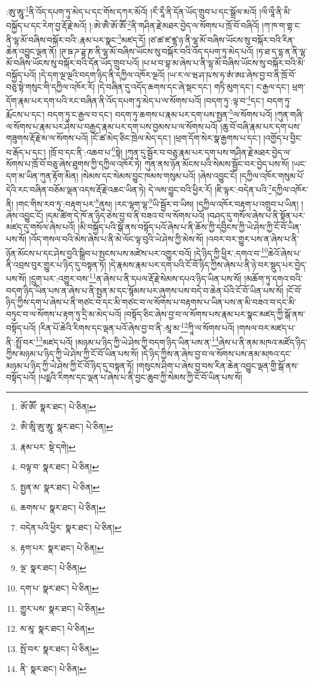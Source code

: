 :ཨུ་ཨཱུ་\footnote{ཨོ་ཨཽ་  སྣར་ཐང་།  པེ་ཅིན། }ནི་འོད་དཔག་ཏུ་མེད་པ་དང་གོས་དཀར་མོའོ། །རྀ་རཱྀ་ནི་དོན་ཡོད་གྲུབ་པ་དང་སྒྲོལ་མའོ། །ལྀ་ལཱྀ་ནི་མི་བསྐྱོད་པ་དང་རེག་བྱ་རྡོ་རྗེ་མའོ། །:ཨེ་ཨཻ་ཨོ་ཨཽ་\footnote{ཨི་ཨཱི་ཨུ་ཨཱུ་  སྣར་ཐང་།  པེ་ཅིན། }ནི་གཤིན་རྗེ་མཐར་བྱེད་ལ་སོགས་པ་ཁྲོ་བོ་བཞིའོ། །ཀ་ཁ་ག་གྷ་ང་ནི་ལྷ་མོ་བཞིས་བསྐོར་བའི་:རྣམ་པར་སྣང་\footnote{རྣམ་པར་  སྡེ་དགེ། }མཛད་དོ། །ཙ་ཚ་ཛ་ཛྷ་ཉ་ནི་ལྷ་མོ་བཞིས་ཡོངས་སུ་བསྐོར་བའི་རིན་ཆེན་འབྱུང་ལྡན་ནོ། །ཊ་ཋ་ཌ་ཌྷ་ཎ་ནི་ལྷ་མོ་བཞིས་ཡོངས་སུ་བསྐོར་བའི་འོད་དཔག་ཏུ་མེད་པའོ། །ཏ་ཐ་ད་དྷ་ན་ནི་ལྷ་མོ་བཞིས་ཡོངས་སུ་བསྐོར་བའི་དོན་ཡོད་གྲུབ་པའོ། །པ་ཕ་བ་བྷ་མ་ཞེས་པ་ནི་ལྷ་མོ་བཞིས་ཡོངས་སུ་བསྐོར་བའི་མི་བསྐྱོད་པའོ། །དེ་དག་ལྔ་ལྔའི་བདག་ཉིད་ནི་དཀྱིལ་འཁོར་ལྔའོ། །ཡ་ར་ལ་ཝ་ཤ་ཥ་ས་ཧ་ཨཾ་ཨཿ་ཞེས་བྱ་བ་ནི་ཁྲོ་བོ་བཅུ་སྟེ་གསུང་གི་དཀྱིལ་འཁོར་རོ། །དེ་བཞིན་དུ་འདོད་ཆགས་དང་ཞེ་སྡང་དང་། གཏི་མུག་དང་། ང་རྒྱལ་དང་། ཕྲག་དོག་རྣམ་པར་དག་པའི་རང་བཞིན་ནི་འོད་དཔག་ཏུ་མེད་པ་ལ་སོགས་པའོ། །བདག་ཏུ་:ལྟ་བ་\footnote{བལྟ་བ་  སྣར་ཐང་།  པེ་ཅིན། }དང་། བདག་ཏུ་རྨོངས་པ་དང་། བདག་ཏུ་ང་རྒྱལ་བ་དང་། བདག་ཏུ་ཆགས་པ་རྣམ་པར་དག་པས་སྤྱན་\footnote{སྤྱན་མ་  སྣར་ཐང་།  པེ་ཅིན། }ལ་སོགས་པའོ། །ཀུན་གཞི་ལ་སོགས་པ་རྣམ་པར་ཤེས་པ་བརྒྱད་རྣམ་པར་དག་པས་བྱམས་པ་ལ་སོགས་པའོ། །ཆུ་བོ་བཞི་རྣམ་པར་དག་པས་གཟུགས་རྡོ་རྗེ་མ་ལ་སོགས་པའོ། །ངོ་ཚ་མེད་ཅིང་ཁྲེལ་མེད་དང་། །ཕྲག་དོག་སེར་སྣ་རྒྱགས་པ་དང་། །འགྱོད་པ་བྱིང་བ་རྒོད་པ་དང་། །ཁྲོ་བ་དང་ནི་:འཆབ་པ་\footnote{ཆགས་པ་  སྣར་ཐང་།  པེ་ཅིན། }སྟེ། །ཀུན་དུ་སྦྱོར་བ་བཅུ་རྣམ་པར་དག་པས་གཤིན་རྗེ་མཐར་བྱེད་ལ་སོགས་པ་ཁྲོ་བོ་བཅུ་ཞེས་ཐུགས་ཀྱི་དཀྱིལ་འཁོར་ཏེ། ཀུན་ནས་ཉོན་མོངས་པའི་སེམས་སྦྱོང་བར་བྱེད་པས་སོ། །ཡང་དག་མ་ཡིན་ཀུན་རྟོག་མིན། །སེམས་དང་སེམས་བྱུང་ཁམས་གསུམ་པའོ། །ཞེས་འབྱུང་ངོ། །དཀྱིལ་འཁོར་གསུམ་པོ་དེའི་རང་བཞིན་བཅོམ་ལྡན་འདས་རྡོ་རྗེ་འཆང་ཡིན་ཏེ། དེ་ལས་བྱུང་བའི་ཕྱིར་རོ། །ཇི་ལྟར་:བདེན་པའི་\footnote{བདེན་པའི་ཕྱིར་  སྣར་ཐང་།  པེ་ཅིན། }དཀྱིལ་འཁོར་ནི། །གང་གིས་རབ་ཏུ་:བརྟག་པར་\footnote{རྟག་པར་  སྣར་ཐང་།  པེ་ཅིན། }ནུས། །རང་ལྷག་ལྷ་\footnote{ལྔ་  སྣར་ཐང་།  པེ་ཅིན། }ཡི་སྦྱོར་བ་ཡིས། །དཀྱིལ་འཁོར་བརྟག་པ་འགྲུབ་པ་ཡིན། །ཞེས་འབྱུང་ངོ། །དམ་ཚིག་དེ་ཁོ་ན་ཉིད་ཅེས་བྱ་བ་ནི་བཟའ་བ་ལ་སོགས་པའོ། །བཤད་དུ་གསོལ་ཞེས་པ་ནི་སྟོན་པར་མཛད་དུ་གསོལ་ཞེས་པའོ། །མི་བསྐྱོད་པའི་སྒོ་ནས་བསྟོད་པའོ་ཞེས་པ་ནི་ཆོས་ཀྱི་དབྱིངས་ཀྱི་ཡེ་ཤེས་ཀྱི་ངོ་བོ་ཡིན་པས་སོ། །འོད་གསལ་བའི་མེས་ཞེས་པ་ནི་མེ་ལོང་ལྟ་བུའི་ཡེ་ཤེས་ཀྱི་མེས་སོ། །འབར་བར་གྱུར་པས་ན་ཞེས་པ་ནི་ཉོན་མོངས་པ་དང་ཤེས་བྱའི་སྒྲིབ་པ་སྤངས་པས་མཛེས་པར་འགྱུར་བའོ། །དེ་ཉིད་ཀྱི་ཕྱིར་:དགའ་བ་\footnote{དག་པ་  སྣར་ཐང་།  པེ་ཅིན། }ཆེའོ་ཞེས་པ་ནི་འབྲས་བུར་གྱུར་པ་ཉིད་དུ་བསྟན་ཏོ། །དེ་རྣམས་རྣམ་པར་དག་པའི་ངོ་བོ་ཉིད་ཀྱིས་ཞེས་པ་ནི་ཉེ་བར་སྡུད་པར་བྱེད་པས་སོ། །དྲུག་པར་:འགྱུར་བས་\footnote{གྱུར་པས་  སྣར་ཐང་།  པེ་ཅིན། }ན་ཞེས་པ་ནི་དཔལ་རྡོ་རྗེ་སེམས་དཔའ་ཉིད་ཡིན་པས་སོ། །མཆོག་ཏུ་དགའ་བའི་བདག་ཉིད་ཡིན་པས་ན་ཞེས་པ་ནི་སྤྱན་མ་དང་སྙོམས་པར་ཞུགས་པས་བདེ་བ་ཆེན་པོའི་ངོ་བོ་ཡིན་པས་སོ། །ངོ་བོ་ཉིད་ཀྱིས་དག་པ་ཞེས་པ་ནི་གཙང་བ་དང་མི་གཙང་བ་ལ་སོགས་པ་བརྟགས་པ་ཡིན་པས་ན་མི་བཟའ་བ་དང་མི་བཏུང་བ་ལ་སོགས་པ་རྟག་ཏུ་དྲི་མ་མེད་པའོ། །བསྟོད་ཅིང་ཞེས་བྱ་བ་ལ་སོགས་པས་རྣམ་པར་སྣང་མཛད་ཀྱི་སྒོ་ནས་བསྟོད་པའོ། །རིན་པོ་ཆེའི་རིགས་དང་ལྡན་པའོ་ཞེས་བྱ་བ་ནི་:མཱ་མ་\footnote{མ་མཱ་  སྣར་ཐང་།  པེ་ཅིན། }ཀཱི་ལ་སོགས་པའོ། །གསལ་བར་མཛད་པ་ནི་:སྤྲོ་བར་\footnote{སྤོ་བར་  སྣར་ཐང་།  པེ་ཅིན། }མཛད་པའོ། །མཉམ་པ་ཉིད་ཀྱི་ཡེ་ཤེས་ཀྱི་བདག་ཉིད་ཡིན་པས་ན་\footnote{ནི་  སྣར་ཐང་།  པེ་ཅིན། }ཞེས་པ་ནི་ནམ་མཁའ་མཛོད་ཉིད་ཀྱིས་མཉམ་པ་ཉིད་ཀྱི་ཡེ་ཤེས་ཀྱི་ངོ་བོ་ཡིན་པས་སོ། །དེ་ཉིད་ཀྱིས་ན་ཞེས་བྱ་བ་ལ་སོགས་པས་ནམ་མཁའ་དང་མཉམ་པ་ཉིད་ཀྱི་ཡེ་ཤེས་ཀྱི་ངོ་བོ་ཉིད་དུ་བསྟན་ཏོ། །གསུངས་ཤིག་པ་ཞེས་བྱ་བས་རིན་ཆེན་འབྱུང་ལྡན་གྱི་སྒོ་ནས་བསྟོད་པའོ། །པདྨའི་རིགས་དང་ལྡན་པ་ཞེས་པ་ནི་བྱང་ཆུབ་ཀྱི་སེམས་ཀྱི་ངོ་བོ་ཡིན་པས་སོ། 